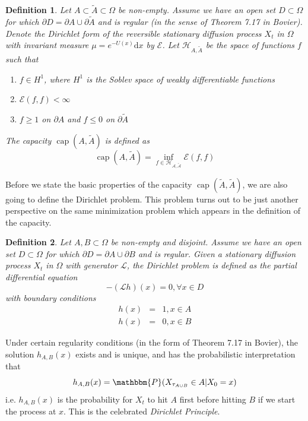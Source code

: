 \documentclass[english, aip, jcp, priprint, graphicx]{revtex4-1}
\newtheorem{definition}{Definition}
\theoremstyle{plain}
\theoremstyle{definition}
\theoremstyle{plain}
\begin{document}
\begin{definition}
Let $A \subset \tilde{A} \subset \Omega$ be non-empty. Assume we have an
open set $D \subset \Omega$ for which $\partial D = \partial A \cup \partial
\tilde{A}$ and is regular (in the sense of Theorem 7.17 in
Bovier\cite{Bovier2016-ez}). Denote the Dirichlet form of the reversible
stationary diffusion process $X_t$ in $\Omega$ with invariant measure
${\mu}= e^{- U (x)} \mathrm{d} x$ by $\mathcal{E}$. Let $\mathcal{H}_{A,
\tilde{A}}$ be the space of functions $f$ such that
\begin{enumerate}
\item $f \in H^1$, where $H^1$ is the Soblev space of weakly
differentiable functions

\item $\mathcal{E} (f, f) < \infty$

\item $f \geqslant 1$ on $\partial A$ and $f \leqslant 0$ on $\partial
\tilde{A}$
\end{enumerate}
The capacity $\ensuremath{\operatorname{cap}} (A, \tilde{A})$ is defined as
\[ \ensuremath{\operatorname{cap}} (A, \tilde{A}) = \inf_{f \in
\mathcal{H_{A, \tilde{A}}}} \mathcal{E} (f, f) \]
\end{definition}

Before we state the basic properties of the capacity
$\ensuremath{\operatorname{cap}} (\tilde{A}, \tilde{A})$, we are also going to
define the Dirichlet problem. This problem turns out to be just another
perspective on the same minimization problem which appears in the definition
of the capacity.

\begin{definition}
Let $A, B \subset \Omega$ be non-empty and disjoint. Assume we have an open
set $D \subset \Omega$ for which $\partial D = \partial A \cup \partial B$
and is regular. Given a stationary diffusion process $X_t$ in $\Omega$ with
generator $\mathcal{L}$, the Dirichlet problem is defined as the partial
differential equation
\[ - (\mathcal{L} h) (x) = 0, \forall x \in D \]
with boundary conditions
\begin{eqnarray*}
h (x) & = & 1, x \in A\\
h (x) & = & 0, x \in B
\end{eqnarray*}
\end{definition}

Under certain regularity conditions (in the form of Theorem 7.17 in
Bovier\cite{Bovier2016-ez}), the solution $h_{A, B} (x)$ exists and is
unique, and has the probabilistic interpretation that
\[ h_{A, B} (x) =\mathbbm{P} (X_{\tau_{A \cup B}} \in A|X_0 = x) \]
i.e. $h_{A, B} (x)$ is the probability for $X_t$ to hit $A$ first before
hitting $B$ if we start the process at $x$. This is the celebrated
{\itshape{Dirichlet Principle}}.
\end{document}
